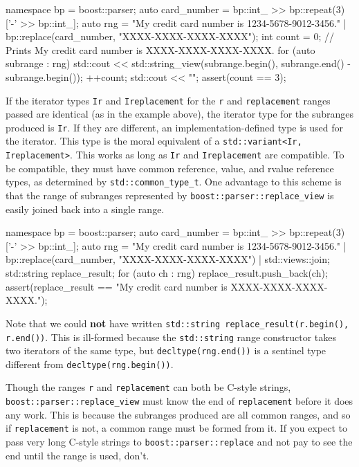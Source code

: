\begin{code}
namespace bp = boost::parser;
auto card_number = bp::int_ >> bp::repeat(3)['-' >> bp::int_];
auto rng = "My credit card number is 1234-5678-9012-3456." | bp::replace(card_number, "XXXX-XXXX-XXXX-XXXX");
int count = 0;
// Prints My credit card number is XXXX-XXXX-XXXX-XXXX.
for (auto subrange : rng) {
    std::cout << std::string_view(subrange.begin(), subrange.end() - subrange.begin());
    ++count;
}
std::cout << "\n";
assert(count == 3);
\end{code}

If the iterator types \texttt{Ir} and \texttt{Ireplacement} for the \texttt{r} and \texttt{replacement} ranges passed are identical (as in the example above), the iterator type for the subranges produced is \texttt{Ir}. If they are different, an implementation-defined type is used for the iterator. This type is the moral equivalent of a \texttt{std::variant<Ir, Ireplacement>}. This works as long as \texttt{Ir} and \texttt{Ireplacement} are compatible. To be compatible, they must have common reference, value, and rvalue reference types, as determined by \texttt{std::common\_type\_t}. One advantage to this scheme is that the range of subranges represented by \texttt{boost::parser::replace\_view} is easily joined back into a single range.

\begin{code}
namespace bp = boost::parser;
auto card_number = bp::int_ >> bp::repeat(3)['-' >> bp::int_];
auto rng = "My credit card number is 1234-5678-9012-3456." | bp::replace(card_number, "XXXX-XXXX-XXXX-XXXX") | std::views::join;
std::string replace_result;
for (auto ch : rng) {
    replace_result.push_back(ch);
}
assert(replace_result == "My credit card number is XXXX-XXXX-XXXX-XXXX.");
\end{code}

Note that we could \textbf{not} have written \texttt{std::string replace\_result(r.begin(), r.end())}. This is ill-formed because the \texttt{std::string} range constructor takes two iterators of the same type, but \texttt{decltype(rng.end())} is a sentinel type different from \texttt{decltype(rng.begin())}.

Though the ranges \texttt{r} and \texttt{replacement} can both be C-style strings, \texttt{boost::parser::replace\_view} must know the end of \texttt{replacement} before it does any work. This is because the subranges produced are all common ranges, and so if \texttt{replacement} is not, a common range must be formed from it. If you expect to pass very long C-style strings to \texttt{boost::parser::replace} and not pay to see the end until the range is used, don't.

